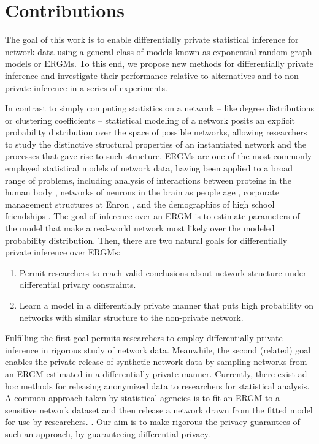 \section{Contributions}

The goal of this work is to enable differentially private statistical inference for network data using a general class of models known as exponential random graph models or ERGMs. To this end, we propose new methods for differentially private inference and investigate their performance relative to alternatives and to non-private inference in a series of experiments. 

In contrast to simply computing statistics on a network -- like degree distributions or clustering coefficients -- statistical modeling of a network posits an explicit probability distribution over the space of possible networks, allowing researchers to study the distinctive structural properties of an instantiated network and the processes that gave rise to such structure. ERGMs are one of the most commonly employed statistical models of network data, having been applied to a broad range of problems, including analysis of interactions between proteins in the human body \cite{EBB10}, networks of neurons in the brain as people age  \cite{Sin+16}, corporate management structures at Enron  \cite{UHH13}, and the demographics of high school friendships \cite{GKM09}. The goal of inference over an ERGM is to estimate parameters of the model that make a real-world network most likely over the modeled probability distribution. Then, there are two natural goals for differentially private inference over ERGMs:
\vspace{-1.5em}
\begin{enumerate}
	\item Permit researchers to reach valid conclusions about network structure under differential privacy constraints.
	\item Learn a model in a differentially private manner that puts high probability on networks with similar structure to the non-private network.
\end{enumerate}
\vspace{-1.5em}
Fulfilling the first goal permits researchers to employ differentially private inference in rigorous study of network data. Meanwhile, the second (related) goal enables the private release of synthetic network data by sampling networks from an ERGM estimated in a differentially private manner. Currently, there exist ad-hoc methods for releasing anonymized data to researchers for statistical analysis. A common approach taken by statistical agencies is to fit an ERGM to a sensitive network dataset and then release a network drawn from the fitted model for use by researchers. \cite{ergm}. Our aim is to make rigorous the privacy guarantees of such an approach, by guaranteeing differential privacy. 

